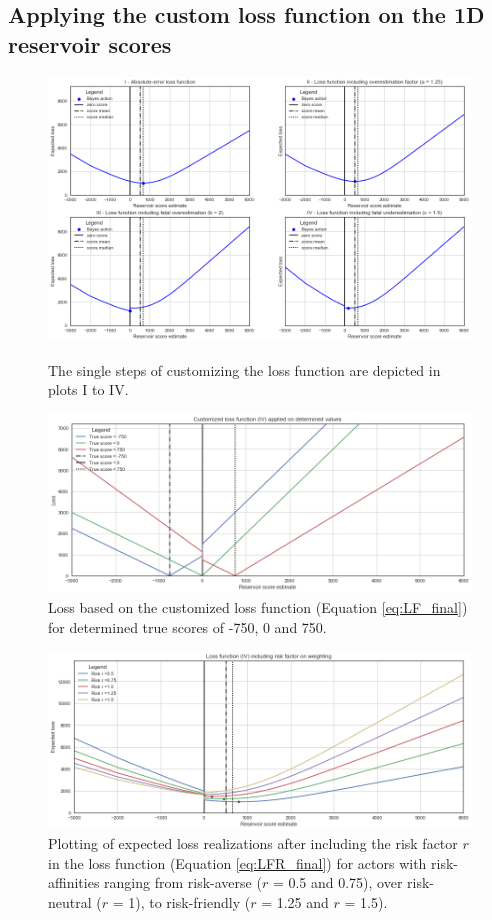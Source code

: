 			\subsection{Applying the custom loss function on the 1D reservoir scores}

			\begin{figure}[p!]
				\centering
				\includegraphics[width=1\textwidth]{Figures/LF_4steps.png}
				\caption{The single steps of customizing the loss function are depicted in plots I to IV.}\label{fig:LF_4steps}
				\centering
				\includegraphics[width=1\textwidth]{Figures/LF4_det_values.png}
				\caption{Loss based on the customized loss function (Equation \ref{eq:LF_final}) for determined true scores of -750, 0 and 750.}\label{fig:LF4_det_values}
			\end{figure}			
			\begin{figure}[h]
				\centering
				\includegraphics[width=1\textwidth]{Figures/LFR.png}
				\caption{Plotting of expected loss realizations after including the risk factor $r$ in the loss function (Equation \ref{eq:LFR_final}) for actors with risk-affinities ranging from risk-averse ($r$ = 0.5 and 0.75), over risk-neutral ($r$ = 1), to risk-friendly ($r$ = 1.25 and $r$ = 1.5).}\label{fig:1D_LFR} 
			\end{figure}
			
